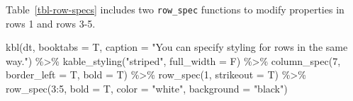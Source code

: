 \documentclass[
  letterpaper,
  DIV=11,
  numbers=noendperiod]{scrartcl}
\newenvironment{Shaded}{\begin{snugshade}}{\end{snugshade}}
\newcommand{\AttributeTok}[1]{\textcolor[rgb]{0.40,0.45,0.13}{#1}}
\newcommand{\DecValTok}[1]{\textcolor[rgb]{0.68,0.00,0.00}{#1}}
\newcommand{\FunctionTok}[1]{\textcolor[rgb]{0.28,0.35,0.67}{#1}}
\newcommand{\NormalTok}[1]{\textcolor[rgb]{0.00,0.23,0.31}{#1}}
\newcommand{\SpecialCharTok}[1]{\textcolor[rgb]{0.37,0.37,0.37}{#1}}
\newcommand{\StringTok}[1]{\textcolor[rgb]{0.13,0.47,0.30}{#1}}
\begin{document}
Table~\ref{tbl-row-specs} includes two \texttt{row\_spec} functions to
modify properties in rows 1 and rows 3-5.

\begin{Shaded}
\begin{Highlighting}[]
\FunctionTok{kbl}\NormalTok{(dt, }\AttributeTok{booktabs =}\NormalTok{ T,}
    \AttributeTok{caption =} \StringTok{"You can specify styling for rows in the same way."}\NormalTok{) }\SpecialCharTok{\%\textgreater{}\%}
  \FunctionTok{kable\_styling}\NormalTok{(}\StringTok{"striped"}\NormalTok{, }\AttributeTok{full\_width =}\NormalTok{ F) }\SpecialCharTok{\%\textgreater{}\%}
  \FunctionTok{column\_spec}\NormalTok{(}\DecValTok{7}\NormalTok{, }\AttributeTok{border\_left =}\NormalTok{ T, }\AttributeTok{bold =}\NormalTok{ T) }\SpecialCharTok{\%\textgreater{}\%}
  \FunctionTok{row\_spec}\NormalTok{(}\DecValTok{1}\NormalTok{, }\AttributeTok{strikeout =}\NormalTok{ T) }\SpecialCharTok{\%\textgreater{}\%}
  \FunctionTok{row\_spec}\NormalTok{(}\DecValTok{3}\SpecialCharTok{:}\DecValTok{5}\NormalTok{, }\AttributeTok{bold =}\NormalTok{ T, }\AttributeTok{color =} \StringTok{"white"}\NormalTok{, }\AttributeTok{background =} \StringTok{"black"}\NormalTok{)}
\end{Highlighting}
\end{Shaded}
\end{document}
